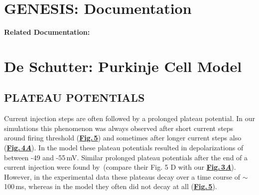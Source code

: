 \documentclass[12pt]{article}
\begin{document}
\section*{GENESIS: Documentation}

{\bf Related Documentation:}

\section*{De Schutter: Purkinje Cell Model}

\subsection*{PLATEAU POTENTIALS}

Current injection steps are often followed
by a prolonged plateau potential. In our simulations
this phenomenon was always observed after short current
steps around firing threshold (\href{../pub-purkinje-deschutter1-fig-5/pub-purkinje-deschutter1-fig-5.tex}{\bf Fig.\,5}) and sometimes after
longer current steps also (\href{../pub-purkinje-deschutter1-fig-4/pub-purkinje-deschutter1-fig-4.tex}{\bf Fig.\,4{\it A}}). In the model these
plateau potentials resulted in depolarizations of between
-49 and -55\,mV. Similar prolonged plateau potentials
after the end of a current injection were found by\,\cite{R:1980pi} (compare their Fig. 5 D with our \href{../pub-purkinje-deschutter1-fig-3/pub-purkinje-deschutter1-fig-3.tex}{\bf Fig.\,3{\it A}}). However, in the experimental data these plateaus decay
over a time course of $\sim$\,100\,ms, whereas in the model
they often did not decay at all (\href{../pub-purkinje-deschutter1-fig-5/pub-purkinje-deschutter1-fig-5.tex}{\bf Fig.\,5}).
\end{document}
